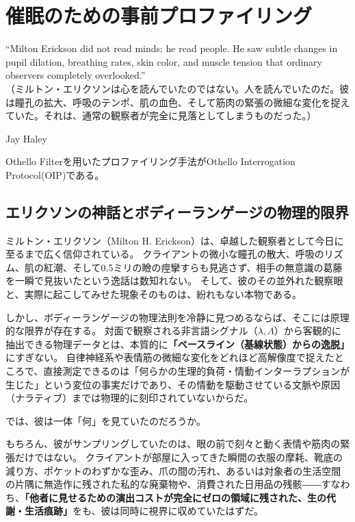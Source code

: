 \chapter{催眠のための事前プロファイリング}
\epigraph{``Milton Erickson did not read minds; he read people. He saw subtle changes in pupil dilation, breathing rates, skin color, and muscle tension that ordinary observers completely overlooked.''\\（ミルトン・エリクソンは心を読んでいたのではない。人を読んでいたのだ。彼は瞳孔の拡大、呼吸のテンポ、肌の血色、そして筋肉の緊張の微細な変化を捉えていた。それは、通常の観察者が完全に見落としてしまうものだった。）}{Jay Haley}

Othello Filter\texttrademark を用いたプロファイリング手法がOthello Interrogation Protocol\texttrademark (OIP)である。

\section{エリクソンの神話とボディーランゲージの物理的限界}

ミルトン・エリクソン（Milton H. Erickson）は、卓越した観察者として今日に至るまで広く信仰されている。
クライアントの微小な瞳孔の散大、呼吸のリズム、肌の紅潮、そして0.5ミリの瞼の痙攣すらも見逃さず、相手の無意識の葛藤を一瞬で見抜いたという逸話は数知れない。
そして、彼のその並外れた観察眼と、実際に起こしてみせた現象そのものは、紛れもない本物である。

しかし、ボディーランゲージの物理法則を冷静に見つめるならば、そこには原理的な限界が存在する。
対面で観察される非言語シグナル（$\lambda, \Lambda$）から客観的に抽出できる物理データとは、本質的に\textbf{「ベースライン（基線状態）からの逸脱」}にすぎない。
自律神経系や表情筋の微細な変化をどれほど高解像度で捉えたところで、直接測定できるのは「何らかの生理的負荷・情動インターラプションが生じた」という変位の事実だけであり、その情動を駆動させている文脈や原因（ナラティブ）までは物理的に刻印されていないからだ。

では、彼は一体「何」を見ていたのだろうか。

もちろん、彼がサンプリングしていたのは、眼の前で刻々と動く表情や筋肉の緊張だけではない。
クライアントが部屋に入ってきた瞬間の衣服の摩耗、靴底の減り方、ポケットのわずかな歪み、爪の間の汚れ、あるいは対象者の生活空間の片隅に無造作に残された私的な廃棄物や、消費された日用品の残骸――すなわち、\textbf{「他者に見せるための演出コストが完全にゼロの領域に残された、生の代謝・生活痕跡」}をも、彼は同時に視界に収めていたはずだ。

